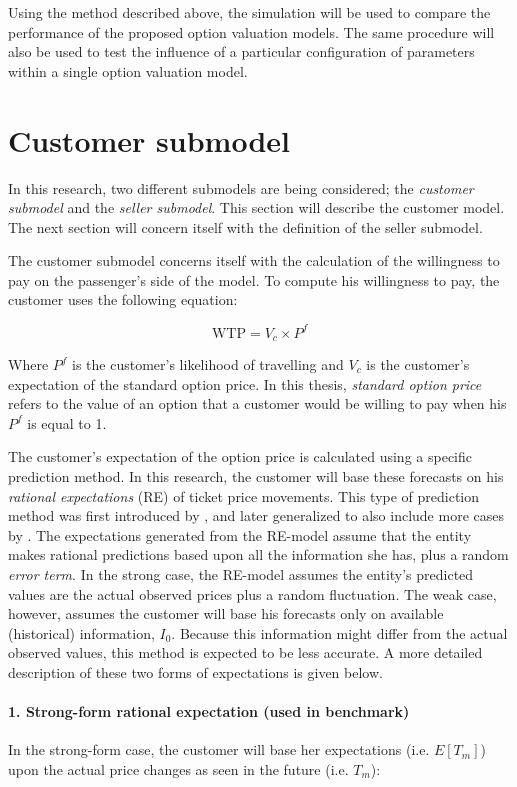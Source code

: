 Using the method described above, the simulation will be used to compare the performance of the proposed option valuation models. The same procedure will also be used to test the influence of a particular configuration of parameters within a single option valuation model.


\section{Customer submodel}
\label{sec:CustomerSubmodel}
In this research, two different submodels are being considered; the \emph{customer submodel} and the \emph{seller submodel}. This section will describe the customer model. The next section will concern itself with the definition of the seller submodel.

The customer submodel concerns itself with the calculation of the willingness to pay on the passenger's side of the model. To compute his willingness to pay, the customer uses the following equation:

$$ \mbox{WTP} = V_c \times P^f $$

Where $P^f$ is the customer's likelihood of travelling and $V_c$ is the customer's expectation of the standard option price. In this thesis, \emph{standard option price} refers to the value of an option that a customer would be willing to pay when his $P^f$ is equal to 1.

The customer's expectation of the option price is calculated using a specific prediction method. In this research, the customer will base these forecasts on his \emph{rational expectations} (RE) of ticket price movements. This type of prediction method was first introduced by , and later generalized to also include more cases by . The expectations generated from the RE-model assume that the entity makes rational predictions based upon all the information she has, plus a random \emph{error term}. In the strong case, the RE-model assumes the entity's predicted values are the actual observed prices plus a random fluctuation. The weak case, however, assumes the customer will base his forecasts only on available (historical) information, $I_0$. Because this information might differ from the actual observed values, this method is expected to be less accurate. A more detailed description of these two forms of expectations is given below.

\paragraph{1. Strong-form rational expectation (used in benchmark)}
In the strong-form case, the customer will base her expectations (i.e. $E[T_m]$) upon the actual price changes as seen in the future (i.e. $T_m$):

